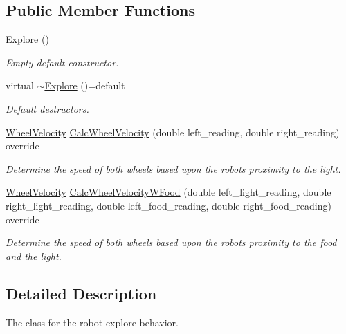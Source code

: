 \subsection*{Public Member Functions}
\begin{DoxyCompactItemize}
\item 
\mbox{\label{class_explore_a8ace99bb96956cb6b4c7d4e32923a843}} 
\mbox{\hyperlink{class_explore_a8ace99bb96956cb6b4c7d4e32923a843}{Explore}} ()
\begin{DoxyCompactList}\small\item\em Empty default constructor. \end{DoxyCompactList}\item 
\mbox{\label{class_explore_a0ef9a84d8be98aedc05cbd05232c4095}} 
virtual \mbox{\hyperlink{class_explore_a0ef9a84d8be98aedc05cbd05232c4095}{$\sim$\+Explore}} ()=default
\begin{DoxyCompactList}\small\item\em Default destructors. \end{DoxyCompactList}\item 
\mbox{\hyperlink{struct_wheel_velocity}{Wheel\+Velocity}} \mbox{\hyperlink{class_explore_aae196c161cfab6179cb7c93722c44937}{Calc\+Wheel\+Velocity}} (double left\+\_\+reading, double right\+\_\+reading) override
\begin{DoxyCompactList}\small\item\em Determine the speed of both wheels based upon the robots proximity to the light. \end{DoxyCompactList}\item 
\mbox{\hyperlink{struct_wheel_velocity}{Wheel\+Velocity}} \mbox{\hyperlink{class_explore_aee6c025989c1aef2c76ccaa3db61ace1}{Calc\+Wheel\+Velocity\+W\+Food}} (double left\+\_\+light\+\_\+reading, double right\+\_\+light\+\_\+reading, double left\+\_\+food\+\_\+reading, double right\+\_\+food\+\_\+reading) override
\begin{DoxyCompactList}\small\item\em Determine the speed of both wheels based upon the robots proximity to the food and the light. \end{DoxyCompactList}\end{DoxyCompactItemize}


\subsection{Detailed Description}
The class for the robot explore behavior. 

